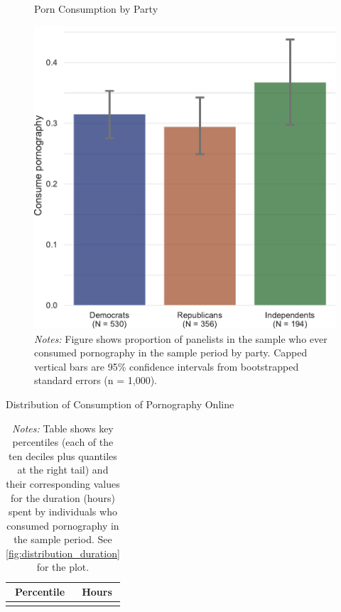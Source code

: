 \documentclass[12pt, letterpaper]{article}
\begin{document}
\begin{figure}
	\centering
	\caption{Porn Consumption by Party}
	\includegraphics[width=.5\textwidth]{../figs/consume_porn_yes_no.pdf}
	\caption*{\footnotesize \emph{Notes:} 
		Figure shows proportion of panelists in the sample who ever consumed pornography in the sample period by party.
		Capped vertical bars are 95\% confidence intervals from bootstrapped standard errors (n = 1,000).
	}
	\label{fig:consume_porn_yes_no}
\end{figure}


\begin{table}[ht] \centering \small \setlength\tabcolsep{10 pt}
	\caption{Distribution of Consumption of Pornography Online}
	\label{tab:distribution_duration}
	\begin{adjustbox}{max width=\textwidth}
		\begin{tabular}{cr}
			\toprule
			\multicolumn{1}{c}{\textbf{Percentile}}&\multicolumn{1}{c}{\textbf{Hours}}\\
			\midrule
			\\
			\bottomrule
		\end{tabular}
	\end{adjustbox}
	\caption*{\footnotesize \emph{Notes:} 
		Table shows key percentiles (each of the ten deciles plus quantiles at the right tail) and their corresponding values for the duration (hours) spent by individuals who consumed pornography in the sample period. 
		See \cref{fig:distribution_duration} for the plot.
	}
\end{table}
\end{document}

